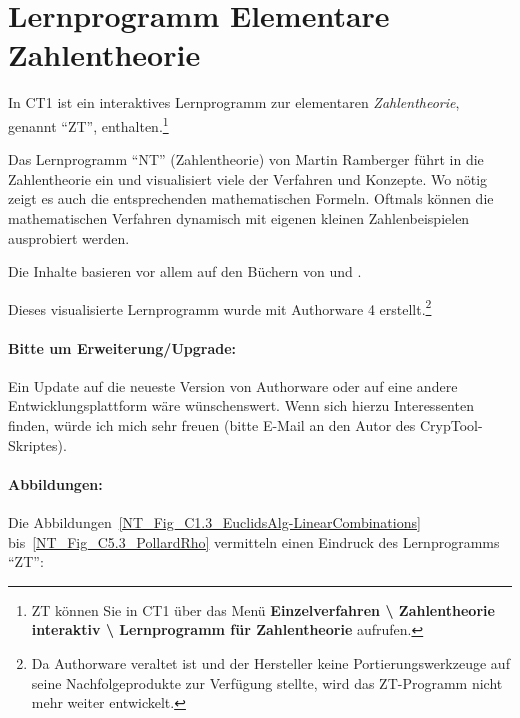 \begin{refsegment}
\hypertarget{appendix-Learn-NT}{}
\section{Lernprogramm Elementare Zahlentheorie}
    \label{s:appendix-Learn-NT}

In CT1 ist ein interaktives Lernprogramm zur elementaren
{\em Zahlentheorie}, genannt "`ZT"', enthalten.\footnote{%
    ZT können Sie in CT1 über das Menü
    \textbf{Einzelverfahren \textbackslash{} Zahlentheorie
    interaktiv \textbackslash{} Lernprogramm für Zahlentheorie} aufrufen.
}

Das Lernprogramm "`NT"' (Zahlentheorie) von Martin Ramberger führt in die
Zahlentheorie ein und visualisiert viele der Verfahren und Konzepte.
Wo nötig zeigt es auch die entsprechenden mathematischen Formeln.
Oftmals können die mathematischen Verfahren dynamisch mit eigenen kleinen
Zahlenbeispielen ausprobiert werden.

Die Inhalte basieren vor allem auf den Büchern von
\cite{Buchmann2016} und \cite{Scheid2006}.

Dieses visualisierte Lernprogramm wurde mit Authorware 4 erstellt.\footnote{%
    Da Authorware veraltet ist und der Hersteller keine Portierungswerkzeuge
    auf seine Nachfolgeprodukte zur Verfügung stellte, wird das ZT-Programm
    nicht mehr weiter entwickelt.
}

\paragraph*{Bitte um Erweiterung/Upgrade:}
Ein Update auf die neueste Version von Authorware oder auf eine andere
Entwicklungsplattform wäre wünschenswert. Wenn sich hierzu Interessenten
finden, würde ich mich sehr freuen (bitte E-Mail an den Autor des
CrypTool-Skriptes).


\paragraph*{Abbildungen:}
Die Abbildungen~\ref{NT_Fig_C1.3_EuclidsAlg-LinearCombinations}
bis~\ref{NT_Fig_C5.3_PollardRho} vermitteln einen Eindruck des
Lernprogramms "`ZT"':



\end{refsegment}
